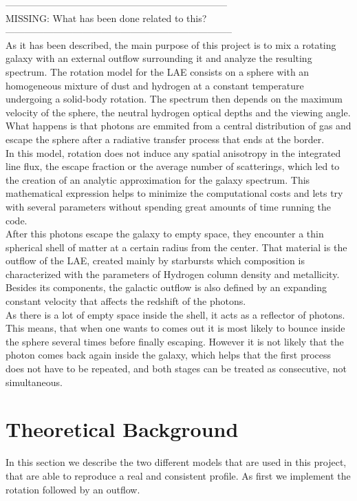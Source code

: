 \documentclass{latex/emulateapj}
\begin{document}
---------------------------------------------------------------------\\
MISSING: What has been done related to this?\\
-----------------------------------------------------------------------\\

As it has been described, the main purpose of this project is to mix a rotating galaxy with an external outflow surrounding
it and analyze the resulting spectrum. The rotation model for the LAE consists on a sphere with an homogeneous mixture of
dust and hydrogen at a constant temperature undergoing a solid-body rotation. The spectrum then depends on the maximum velocity
of the sphere, the neutral hydrogen optical depths and the viewing angle. What happens is that photons are emmited from a central
distribution of gas and escape the sphere after a radiative transfer process that ends at the border.\\

In this model, rotation does not induce any spatial anisotropy in the integrated line flux, the escape fraction or the average
number of scatterings, which led to the creation of an analytic approximation for the galaxy spectrum. This mathematical expression
helps to minimize the computational costs and lets try with several parameters without spending great amounts of time running the code. \\

After this photons escape the galaxy to empty space, they encounter a thin spherical shell of matter at a certain radius from the
center. That material is the outflow of the LAE, created mainly by starbursts which composition is characterized with the parameters
of Hydrogen column density and metallicity. Besides its components, the galactic outflow is also defined by an expanding constant
velocity that affects the redshift of the photons.\\

As there is a lot of empty space inside the shell, it acts as a reflector of photons. This means, that when one wants to comes out it
is most likely to bounce inside the sphere several times before finally escaping. However it is not likely that the photon comes back
again inside the galaxy, which helps that the first process does not have to be repeated, and both stages can be treated as consecutive,
  not simultaneous. \\


\section{Theoretical Background}
\label{sec:theo}
In this section we describe the two different models that are used in this project,
that are able to reproduce a real and consistent \lya profile. As first we implement
the rotation followed by an outflow.\\
\end{document}
